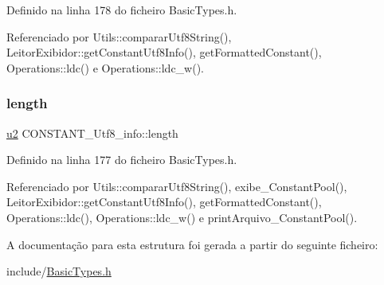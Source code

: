 Definido na linha 178 do ficheiro Basic\+Types.\+h.



Referenciado por Utils\+::comparar\+Utf8\+String(), Leitor\+Exibidor\+::get\+Constant\+Utf8\+Info(), get\+Formatted\+Constant(), Operations\+::ldc() e Operations\+::ldc\+\_\+w().

\mbox{\label{structCONSTANT__Utf8__info_a712975144ad624052a94f4a2ebdb954e}} 
\subsubsection{\texorpdfstring{length}{length}}
{\footnotesize\ttfamily \hyperlink{BasicTypes_8h_a732cde1300aafb73b0ea6c2558a7a54f}{u2} C\+O\+N\+S\+T\+A\+N\+T\+\_\+\+Utf8\+\_\+info\+::length}



Definido na linha 177 do ficheiro Basic\+Types.\+h.



Referenciado por Utils\+::comparar\+Utf8\+String(), exibe\+\_\+\+Constant\+Pool(), Leitor\+Exibidor\+::get\+Constant\+Utf8\+Info(), get\+Formatted\+Constant(), Operations\+::ldc(), Operations\+::ldc\+\_\+w() e print\+Arquivo\+\_\+\+Constant\+Pool().



A documentação para esta estrutura foi gerada a partir do seguinte ficheiro\+:\begin{DoxyCompactItemize}
\item 
include/\hyperlink{BasicTypes_8h}{Basic\+Types.\+h}\end{DoxyCompactItemize}
